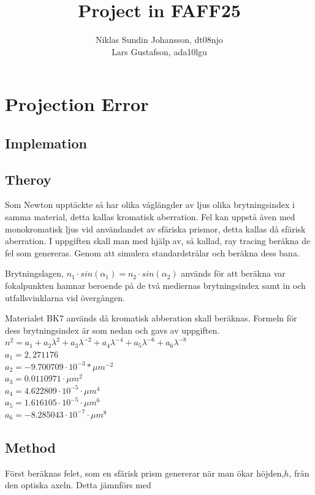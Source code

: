 \documentclass[12pt]{article}
\title{Project in FAFF25}
\author{Niklas Sundin Johansson, dt08njo\\Lars Gustafson, ada10lgu }
\begin{document}
\maketitle

\section{Projection Error}

\subsection{Implemation}

\subsection{Theroy}
Som Newton upptäckte så har olika våglängder av ljus olika brytningsindex i samma material, detta kallas kromatisk aberration. Fel kan uppstå även med monokromatisk ljus vid användandet av sfäriska prismor, detta kallas då sfärisk aberration. I uppgiften skall man med hjälp av, så kallad, ray tracing beräkna de fel som genereras. Genom att simulera standardstrålar och beräkna dess bana.  

Brytningslagen, $n_1 \cdot sin(\alpha _1) = n_2 \cdot sin(\alpha _2) $ används för att beräkna var fokalpunkten hamnar beroende på de två mediernas brytningsindex samt in och utfallsvinklarna vid övergången. 

Materialet BK7 används då kromatisk abberation skall beräknas. Formeln för dess brytningsindex är som nedan och gavs av uppgiften.\\
$n^2 = a_1 + a_2 \lambda^2 + a_3 \lambda^{-2}+a_4 \lambda^{-4}+a_5 \lambda^{-6}+a_6\lambda^{-8}$\\
$a_1= 2,271176$\\
$a_2 = -9.700709 \cdot 10^{-3}*\mu m^{-2}$\\
$a_3 = 0.0110971 \cdot \mu m^2$\\
$a_4 = 4.622809 \cdot 10^{-5} \cdot \mu m^4$\\
$a_5 = 1.616105 \cdot 10^{-5} \cdot \mu m^6$\\
$a_6 = -8.285043 \cdot 10^{-7} \cdot \mu m^8$

\subsection{Method}
Först beräknas felet, som en sfärisk prism genererar när man ökar höjden,$h$, från den optiska axeln. Detta jämnförs med 
\end{document}
